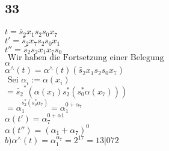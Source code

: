 \documentclass[11pt]{amsart}
\begin{document}
    \subsection*{33}
    
\(    t = \tilde{s_2}x_1s_2s_0x_7 \) \\
 \(   t' = \tilde{s_2}x_7s_2s_0x_1 \) \\
\(    t'' = \tilde{s_2}s_2x_1x_7s_0 \)\\
\(    \mbox{ Wir haben die Fortsetzung einer Belegung } \) \\
\(    \alpha \) \\
\(    \alpha^{\wedge}(t) = \alpha^{\wedge}(t)(\tilde{s_2}x_1s_2s_0x_7) \) \\
\(    \mbox{ Sei }\alpha_i := \alpha(x_i) \) \\
\(    = \tilde{s_2}^{*}(\alpha(x_1)s_2^*(s_0^*\alpha(x_7))) \) \\
\(    = \alpha_1^{s_2^*(s_o^*\alpha_7)}= \alpha_1^{0 + \alpha_7}  \) \\
\(    \alpha(t') = \alpha_7^{0+\alpha1}  \) \\
\(    \alpha(t'') = (\alpha_1 + \alpha_7)^0  \) \\
\(    b) \alpha^{\wedge}(t) = \alpha_1^{\alpha_7} = 2^{17} = 13|072  \) \\
\end{document}

